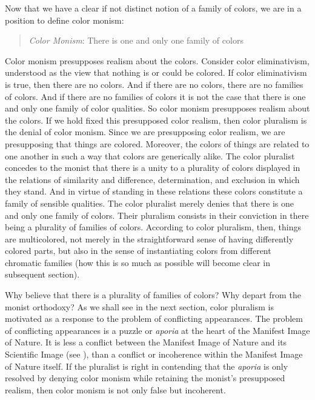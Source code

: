 \documentclass[12pt]{article}
\begin{document}
Now that we have a clear if not distinct notion of a family of colors, we are in a position to define color monism:
\begin{quote}
	\emph{Color Monism}: There is one and only one family of colors
\end{quote}
Color monism presupposes realism about the colors. Consider color eliminativism, understood as the view that nothing is or could be colored. If color eliminativism is true, then there are no colors. And if there are no colors, there are no families of colors. And if there are no families of colors it is not the case that there is one and only one family of color qualities. So color monism presupposes realism about the colors. If we hold fixed this presupposed color realism, then color pluralism is the denial of color monism. Since we are presupposing color realism, we are presupposing that things are colored. Moreover, the colors of things are related to one another in such a way that colors are generically alike. The color pluralist concedes to the monist that there is a unity to a plurality of colors displayed in the relations of similarity and difference, determination, and exclusion in which they stand. And in virtue of standing in these relations these colors constitute a family of sensible qualities. The color pluralist merely denies that there is one and only one family of colors. Their pluralism consists in their conviction in there being a plurality of families of colors. According to color pluralism, then, things are multicolored, not merely in the straightforward sense of having differently colored parts, but also in the sense of instantiating colors from different chromatic families (how this is so much as possible will become clear in subsequent section).

Why believe that there is a plurality of families of colors? Why depart from the monist orthodoxy? As we shall see in the next section, color pluralism is motivated as a response to the problem of conflicting appearances. The problem of conflicting appearances is a puzzle or \emph{aporia} at the heart of the Manifest Image of Nature. It is less a conflict between the Manifest Image of Nature and its Scientific Image (see \citealt{Sellars:1963eo}), than a conflict or incoherence within the Manifest Image of Nature itself. If the pluralist is right in contending that the \emph{aporia} is only resolved by denying color monism while retaining the monist's presupposed realism, then color monism is not only false but incoherent.

\end{document}
